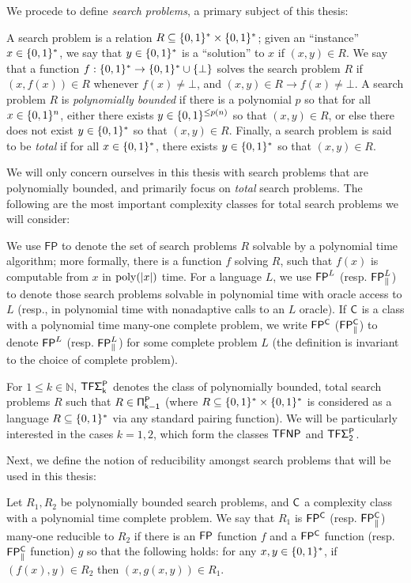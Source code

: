 We procede to define \emph{search problems}, a primary subject of this thesis:
\begin{definition}
A search problem is a relation $R \subseteq \{0,1\}^* \times \{0,1\}^*$; given an ``instance'' $x \in \{0,1\}^*$, we say that $y \in \{0,1\}^*$ is a ``solution'' to $x$ if $(x, y)\in R$. We say that a function $f: \{0,1\}^* \to \{0,1\}^* \cup \{\bot\}$ solves the search problem $R$ if $(x, f(x)) \in R$ whenever $f(x) \neq \bot$, and $(x, y) \in R \rightarrow f(x) \neq \bot$. A search problem $R$ is \emph{polynomially bounded} if there is a polynomial $p$ so that for all $x \in \{0,1\}^n$, either there exists $y \in \{0,1\}^{\leq p(n)}$ so that $(x, y) \in R$, or else there does not exist $y \in \{0,1\}^*$ so that $(x,y) \in R$. Finally, a search problem is said to be \emph{total} if for all $x \in \{0,1\}^*$, there exists $y \in \{0,1\}^*$ so that $(x,y)\in R$.
\end{definition}

We will only concern ourselves in this thesis with search problems that are polynomially bounded, and primarily focus on \emph{total} search problems. The following are the most important complexity classes for total search problems we will consider:
\begin{definition}
We use $\mathsf{FP}$ to denote the set of search problems $R$ solvable by a polynomial time algorithm; more formally, there is a function $f$ solving $R$, such that $f(x)$ is computable from $x$ in $\mathrm{poly}(|x|)$ time. For a language $L$, we use $\cl{FP}^L$ (resp. $\cl{FP}^L_{\cl{\Vert}}$) to denote those search problems solvable in polynomial time with oracle access to $L$ (resp., in polynomial time with nonadaptive calls to an $L$ oracle). If $\cl{C}$ is a class with a polynomial time many-one complete problem, we write $\cl{FP^C}$ ($\cl{FP^C_{\Vert}}$) to denote $\cl{FP}^L$ (resp. $\cl{FP}^L_{\cl{\Vert}}$) for some complete problem $L$ (the definition is invariant to the choice of complete problem). 

For $1 \leq k\in \mathbb{N}$, $\cl{TF \Sigma_k^P}$ denotes the class of polynomially bounded, total search problems $R$ such that $R \in \cl{\Pi_{k-1}^P}$ (where $R \subseteq \{0,1\}^* \times \{0,1\}^*$ is considered as a language $R \subseteq \{0,1\}^*$ via any standard pairing function). We will be particularly interested in the cases $k = 1, 2$, which form the classes $\cl{TFNP}$ and $\cl{TF\Sigma_2^P}$.
\end{definition}

Next, we define the notion of reducibility amongst search problems that will be used in this thesis:
\begin{definition}
Let $R_1, R_2$ be polynomially bounded search problems, and $\cl{C}$ a complexity class with a polynomial time complete problem. We say that $R_1$ is $\cl{FP^{C}}$ (resp. $\cl{FP^C_\cl{\Vert}}$) many-one reducible to $R_2$ if there is an $\cl{FP}$ function $f$ and a $\cl{FP^C}$ function (resp. $\cl{FP^C_\cl{\Vert}}$ function) $g$ so that the following holds: for any $x,y \in \{0,1\}^*$, if $(f(x),y)\in R_2$ then $(x, g(x,y))\in R_1$.
\end{definition}

